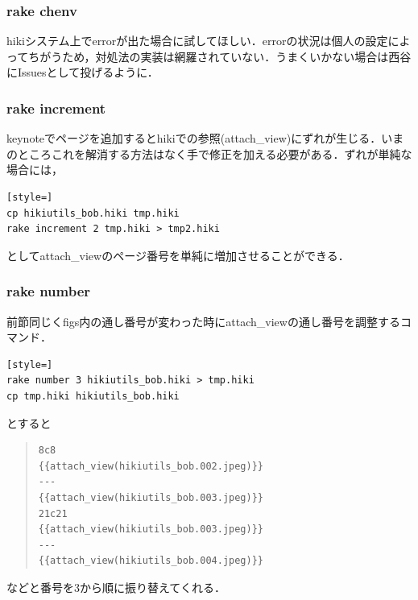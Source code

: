 \subsubsection{rake chenv}
hikiシステム上でerrorが出た場合に試してほしい．errorの状況は個人の設定によってちがうため，対処法の実装は網羅されていない．うまくいかない場合は西谷にIssuesとして投げるように．

\subsubsection{rake increment}
keynoteでページを追加するとhikiでの参照(attach\_view)にずれが生じる．いまのところこれを解消する方法はなく手で修正を加える必要がある．ずれが単純な場合には，
\begin{lstlisting}[style=]
cp hikiutils_bob.hiki tmp.hiki
rake increment 2 tmp.hiki > tmp2.hiki
\end{lstlisting}
としてattach\_viewのページ番号を単純に増加させることができる．

\subsubsection{rake number}
前節同じくfigs内の通し番号が変わった時にattach\_viewの通し番号を調整するコマンド．
\begin{lstlisting}[style=]
rake number 3 hikiutils_bob.hiki > tmp.hiki
cp tmp.hiki hikiutils_bob.hiki
\end{lstlisting}
とすると
\begin{quote}\begin{verbatim}
8c8
{{attach_view(hikiutils_bob.002.jpeg)}}
---
{{attach_view(hikiutils_bob.003.jpeg)}}
21c21
{{attach_view(hikiutils_bob.003.jpeg)}}
---
{{attach_view(hikiutils_bob.004.jpeg)}}
\end{verbatim}\end{quote}
などと番号を3から順に振り替えてくれる．

